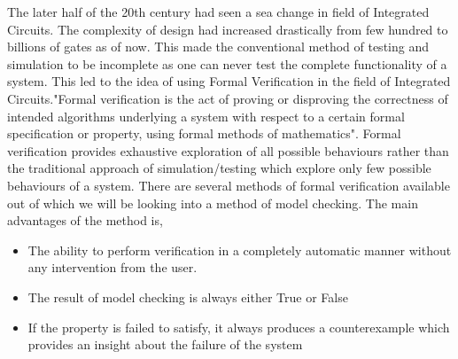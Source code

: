 The later half of the 20th century had seen a sea change in field of Integrated Circuits. The complexity of design had increased drastically from few hundred to billions of gates as of now. This made the conventional method of testing and simulation to be incomplete as one can never test the complete functionality of a system. This led to the idea of using Formal Verification in the field of Integrated Circuits."Formal verification is the act of proving or disproving the correctness of intended algorithms underlying a system with respect to a certain formal specification or property, using formal methods of mathematics"\cite{Alok 2010}. Formal verification provides exhaustive exploration of all possible behaviours rather than the traditional approach of simulation/testing which explore only few possible behaviours of a system. There are several methods of formal verification available out of which we will be looking into a method of model checking. The main advantages of the method is,
\begin{itemize}
\item The ability to perform verification in a completely automatic manner without any intervention from the user.
\item The result of model checking is always either True or False
\item If the property is failed to satisfy, it always produces a counterexample which provides an insight about the failure of the system
\end{itemize}